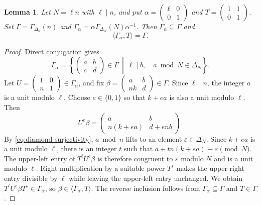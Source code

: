 \documentclass[12pt, letterpaper]{amsart}
\newtheorem{lemma}[theorem]{Lemma}
\theoremstyle{definition}
\theoremstyle{remark}
\numberwithin{equation}{section}
\begin{document}
\begin{lemma}\label{lem:intermediate-parabolic-generation}
Let \(N=\ell n\) with \(\ell\mid n\), and put
\(\alpha=\left(\begin{smallmatrix}\ell&0\\0&1\end{smallmatrix}\right)\) and
\(T=\left(\begin{smallmatrix}1&1\\0&1\end{smallmatrix}\right)\). Set
\(\Gamma=\Gamma_{\Delta_n}(n)\) and
\(\Gamma_\alpha=\alpha\Gamma_{\Delta_N}(N)\alpha^{-1}\).
Then \(\Gamma_\alpha\subseteq\Gamma\) and
\begin{equation}\label{eq:parabolic-generation}
        \langle \Gamma_\alpha,T\rangle=\Gamma.
\end{equation}
\end{lemma}

\begin{proof}
Direct conjugation gives
\[
 \Gamma_\alpha
 =\left\{
 \begin{pmatrix}a&b\\c&d\end{pmatrix}\in\Gamma
 \ \middle|\ \ell\mid b,\quad a\bmod N\in\Delta_N
 \right\}.
\]
Let \(U=\left(\begin{smallmatrix}1&0\\n&1\end{smallmatrix}\right)
\in\Gamma_\alpha\), and fix
\(\beta=\left(\begin{smallmatrix}a&b\\nk&d\end{smallmatrix}\right)\in\Gamma\).
Since \(\ell\mid n\), the integer \(a\) is a unit modulo \(\ell\).
Choose \(e\in\{0,1\}\) so that \(k+ea\) is also a unit modulo \(\ell\).
Then
\[
 U^e\beta=\begin{pmatrix}a&b\\n(k+ea)&d+enb\end{pmatrix}.
\]
By \eqref{eq:diamond-surjectivity}, \(a\bmod n\) lifts to an element
\(\varepsilon\in\Delta_N\). Since \(k+ea\) is a unit modulo \(\ell\), there
is an integer \(t\) such that \(a+tn(k+ea)\equiv\varepsilon\pmod N\).
The upper-left entry of \(T^tU^e\beta\) is therefore congruent to
\(\varepsilon\) modulo \(N\) and is a unit modulo \(\ell\).
Right multiplication by a suitable power \(T^s\) makes the upper-right
entry divisible by \(\ell\) while leaving the upper-left entry unchanged.
We obtain \(T^tU^e\beta T^s\in\Gamma_\alpha\), so
\(\beta\in\langle\Gamma_\alpha,T\rangle\).
The reverse inclusion follows from \(\Gamma_\alpha\subseteq\Gamma\) and
\(T\in\Gamma\).
\end{proof}
\end{document}
